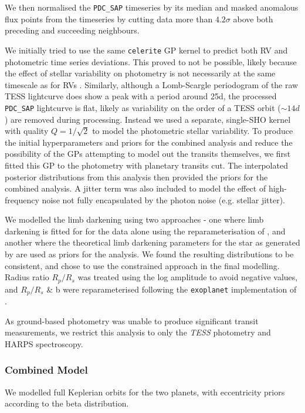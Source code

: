 \documentclass[fleqn,usenatbib]{mnras}
\newcommand{\tess}{{\it TESS}}
\newcommand{\harps}{{HARPS}}
\begin{document}
We then normalised the \texttt{PDC\_SAP} timeseries by its median and masked anomalous flux points from the timeseries by cutting data more than $4.2\sigma$ above both preceding and succeeding neighbours.

We initially tried to use the same \texttt{celerite} GP kernel to predict both RV and photometric time series deviations.
This proved to not be possible, likely because the effect of stellar variability on photometry is not necessarily at the same timescale as for RVs \citep{10.1111/j.1365-2966.2011.19960.x}.
Similarly, although a Lomb-Scargle periodogram of the raw TESS lightcurve does show a peak with a period around 25d, the processed \texttt{PDC\_SAP} lightcurve is flat, likely as variability on the order of a TESS orbit ($\sim 14d$) are removed during processing.
Instead we used a separate, single-SHO kernel with quality $Q=1/\sqrt{2}$ to model the photometric stellar variability.
To produce the initial hyperparameters and priors for the combined analysis and reduce the possibility of the GPs attempting to model out the transits themselves, we first fitted this GP to the photometry with planetary transits cut. The interpolated posterior distributions from this analysis then provided the priors for the combined analysis.
A jitter term was also included to model the effect of high-frequency noise not fully encapsulated by the photon noise (e.g. stellar jitter).

We modelled the limb darkening using two approaches - one where limb darkening is fitted for for the data alone using the reparameterisation of \citet{kipping2013efficient}, and another where the theoretical limb darkening parameters for the star as generated by \citet{claret2017limb} are used as priors for the analysis.
We found the resulting distributions to be consistent, and chose to use the constrained approach in the final modelling.
Radius ratio $R_p/R_s$ was treated using the log amplitude to avoid negative values, and $R_p/R_s$ \& b were reparameterised following the \texttt{exoplanet} implementation of \citet{espinoza2018efficient}.

As ground-based photometry was unable to produce significant transit measurements, we restrict this analysis to only the \tess{} photometry and \harps{} spectroscopy.

\subsubsection{Combined Model}
We modelled full Keplerian orbits for the two planets, with eccentricity priors according to the \citet{kipping2013parametrizing} beta distribution.
\end{document}
